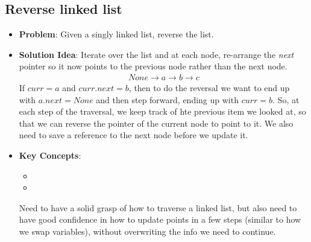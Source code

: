 \documentclass[10pt,a4paper]{article}
\begin{document}
\subsection*{Reverse linked list}
\begin{itemize}
\item \textbf{Problem}: Given a singly linked list, reverse the list.
\item \textbf{Solution Idea}: Iterate over the list and at each node, re-arrange the \textit{next} pointer so it now points to the previous node rather than the next node.
\begin{align*}
    None \rightarrow a \rightarrow b \rightarrow c
\end{align*}
If $curr=a$ and $curr.next = b$, then to do the reversal we want to end up with $a.next = None$ and then step forward, ending up with $curr=b$. So, at each step of the traversal, we keep track of hte previous item we looked at, so that we can reverse the pointer of the current node to point to it. We also need to save a reference to the next node before we update it.
\item \textbf{Key Concepts}:
\begin{itemize}
    \item {}
    \item {}
\end{itemize}
Need to have a solid grasp of how to traverse a linked list, but also need to have good confidence in how to update points in a few steps (similar to how we swap variables), without overwriting the info we need to continue.
\end{itemize}
\end{document}
